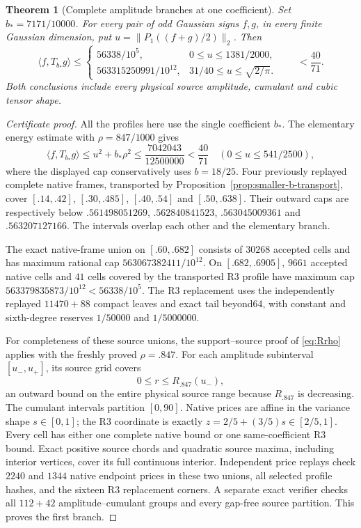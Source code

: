 \documentclass[11pt]{article}
\newtheorem{theorem}{Theorem}
\begin{document}
\begin{theorem}[Complete amplitude branches at one coefficient]
\label{thm:same-b7171-regions}
Set $b_*=7171/10000$.  For every pair of odd Gaussian signs $f,g$,
in every finite Gaussian dimension, put
$u=\|P_1((f+g)/2)\|_2$.  Then
\[
 \langle f,T_{b_*}g\rangle\le
 \begin{cases}
 56338/10^5,&0\le u\le1381/2000,\\[2pt]
 563315250991/10^{12},&31/40\le u\le\sqrt{2/\pi}.
 \end{cases}
 \qquad <\frac{40}{71}.
\]
Both conclusions include every physical source amplitude, cumulant
and cubic tensor shape.
\end{theorem}
\begin{proof}[Certificate proof]
All the profiles here use the single coefficient $b_*$.
The elementary energy estimate with $\rho=847/1000$ gives
\[
 \langle f,T_{b_*}g\rangle
 \le u^2+b_*\rho^2
 \le\frac{7042043}{12500000}<\frac{40}{71}
 \quad(0\le u\le541/2500),
\]
where the displayed cap conservatively uses $b=18/25$.
Four previously replayed complete native frames, transported by
Proposition~\ref{prop:smaller-b-transport}, cover
$[.14,.42]$, $[.30,.485]$, $[.40,.54]$ and $[.50,.638]$.
Their outward caps are respectively below
$.561498051269$, $.562840841523$, $.563045009361$ and
$.563207127166$.  The intervals overlap each other and the elementary
branch.

The exact native-frame union on $[.60,.682]$ consists of $30268$
accepted cells and has maximum rational cap
$563067382411/10^{12}$.  On $[.682,.6905]$, $9661$ accepted native
cells and $41$ cells covered by the transported R3 profile have
maximum cap $563379835873/10^{12}<56338/10^5$.
The R3 replacement uses the independently replayed $11470+88$
compact leaves and exact tail beyond64, with constant and sixth-degree
reserves $1/50000$ and $1/5000000$.

For completeness of these source unions, the support--source proof
of \eqref{eq:Rrho} applies with the freshly proved $\rho=.847$.
For each amplitude subinterval $[u_-,u_+]$, its source grid covers
\[
 0\le r\le R_{.847}(u_-),
\]
an outward bound on the entire physical source range because
$R_{.847}$ is decreasing.  The cumulant intervals partition $[0,90]$.
Native prices are affine in the variance shape $s\in[0,1]$;
the R3 coordinate is exactly $z=2/5+(3/5)s\in[2/5,1]$.
Every cell has either one complete native bound or one same-coefficient
R3 bound.  Exact positive source chords and quadratic source maxima,
including interior vertices, cover its full continuous interior.
Independent price replays check $2240$ and $1344$ native endpoint
prices in these two unions, all selected profile hashes, and the
sixteen R3 replacement corners.  A separate exact verifier checks
all $112+42$ amplitude--cumulant groups and every gap-free source
partition.  This proves the first branch.


\end{proof}
\end{document}
